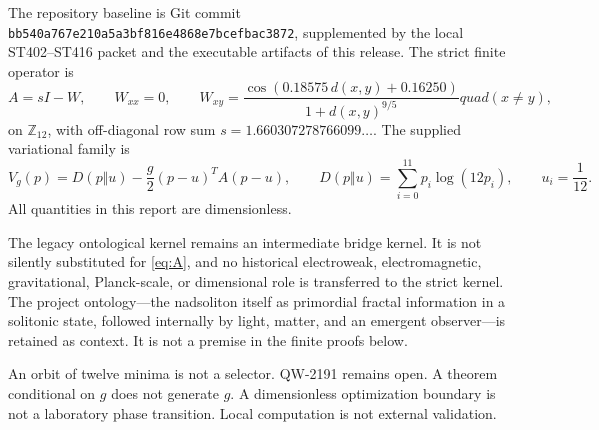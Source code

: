 \documentclass[11pt,a4paper]{article}
\begin{document}
The repository baseline is Git commit
\texttt{bb540a767e210a5a3bf816e4868e7bcefbac3872}, supplemented by the
local ST402--ST416 packet and the executable artifacts of this release.  The
strict finite operator is
\begin{equation}\label{eq:A}
 A=sI-W,\qquad W_{xx}=0,\qquad
 W_{xy}=\frac{\cos(0.18575\,d(x,y)+0.16250)}{1+d(x,y)^{9/5}}quad(x\ne y),
\end{equation}
on $\mathbb Z_{12}$, with off-diagonal row sum
$s=1.660307278766099\ldots$.  The supplied variational family is
\begin{equation}\label{eq:V}
 V_g(p)=D(p\Vert u)-\frac g2(p-u)^TA(p-u),\qquad
 D(p\Vert u)=\sum_{i=0}^{11}p_i\log(12p_i),\qquad u_i=\frac1{12}.
\end{equation}
All quantities in this report are dimensionless.

The legacy ontological kernel remains an intermediate bridge kernel.  It is
not silently substituted for \eqref{eq:A}, and no historical electroweak,
electromagnetic, gravitational, Planck-scale, or dimensional role is
transferred to the strict kernel.  The project ontology---the nadsoliton itself
as primordial fractal information in a solitonic state, followed internally by
light, matter, and an emergent observer---is retained as context.  It is not a
premise in the finite proofs below.

An orbit of twelve minima is not a selector.  QW-2191 remains open.  A theorem
conditional on $g$ does not generate $g$.  A dimensionless optimization
boundary is not a laboratory phase transition.  Local computation is not
external validation.
\end{document}
